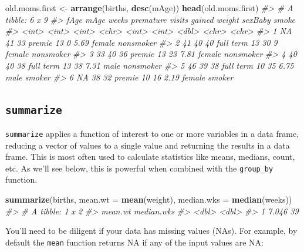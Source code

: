 \documentclass[]{book}
\newenvironment{Shaded}{\begin{snugshade}}{\end{snugshade}}
\newcommand{\CommentTok}[1]{\textcolor[rgb]{0.56,0.35,0.01}{\textit{#1}}}
\newcommand{\DataTypeTok}[1]{\textcolor[rgb]{0.13,0.29,0.53}{#1}}
\newcommand{\KeywordTok}[1]{\textcolor[rgb]{0.13,0.29,0.53}{\textbf{#1}}}
\newcommand{\NormalTok}[1]{#1}
\newcommand{\StringTok}[1]{\textcolor[rgb]{0.31,0.60,0.02}{#1}}
\theoremstyle{definition}
\theoremstyle{definition}
\theoremstyle{definition}
\theoremstyle{remark}
\begin{document}
\begin{Shaded}
\begin{Highlighting}[]
\NormalTok{old.moms.first <-}\StringTok{ }\KeywordTok{arrange}\NormalTok{(births, }\KeywordTok{desc}\NormalTok{(mAge))}
\KeywordTok{head}\NormalTok{(old.moms.first)}
\CommentTok{#> # A tibble: 6 x 9}
\CommentTok{#>    fAge  mAge weeks premature visits gained weight sexBaby smoke    }
\CommentTok{#>   <int> <int> <int> <chr>      <int>  <int>  <dbl> <chr>   <chr>    }
\CommentTok{#> 1    NA    41    33 premie        13      0   5.69 female  nonsmoker}
\CommentTok{#> 2    41    40    40 full term     13     30   9    female  nonsmoker}
\CommentTok{#> 3    33    40    36 premie        13     23   7.81 female  nonsmoker}
\CommentTok{#> 4    40    40    38 full term     13     38   7.31 male    nonsmoker}
\CommentTok{#> 5    46    39    38 full term     10     35   6.75 male    smoker   }
\CommentTok{#> 6    NA    38    32 premie        10     16   2.19 female  smoker}
\end{Highlighting}
\end{Shaded}

\hypertarget{summarize}{%
\subsection{\texorpdfstring{\texttt{summarize}}{summarize}}\label{summarize}}

\texttt{summarize} applies a function of interest to one or more
variables in a data frame, reducing a vector of values to a single value
and returning the results in a data frame. This is most often used to
calculate statistics like means, medians, count, etc. As we'll see
below, this is powerful when combined with the \texttt{group\_by}
function.

\begin{Shaded}
\begin{Highlighting}[]
\KeywordTok{summarize}\NormalTok{(births, }
          \DataTypeTok{mean.wt =} \KeywordTok{mean}\NormalTok{(weight), }
          \DataTypeTok{median.wks =} \KeywordTok{median}\NormalTok{(weeks))}
\CommentTok{#> # A tibble: 1 x 2}
\CommentTok{#>   mean.wt median.wks}
\CommentTok{#>     <dbl>      <dbl>}
\CommentTok{#> 1   7.046         39}
\end{Highlighting}
\end{Shaded}

You'll need to be diligent if your data has missing values (NAs). For
example, by default the \texttt{mean} function returns NA if any of the
input values are NA:
\end{document}
